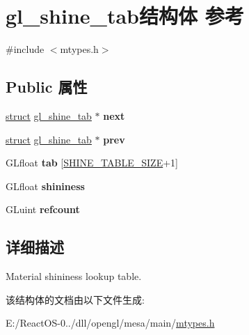 \hypertarget{structgl__shine__tab}{}\section{gl\+\_\+shine\+\_\+tab结构体 参考}
\label{structgl__shine__tab}


{\ttfamily \#include $<$mtypes.\+h$>$}

\subsection*{Public 属性}
\begin{DoxyCompactItemize}
\item 
\mbox{\label{structgl__shine__tab_abfcac7b422b65e0a62364338eef1131c}} 
\hyperlink{interfacestruct}{struct} \hyperlink{structgl__shine__tab}{gl\+\_\+shine\+\_\+tab} $\ast$ {\bfseries next}
\item 
\mbox{\label{structgl__shine__tab_a185d73519a887ba6f4fe4ed7eafd5063}} 
\hyperlink{interfacestruct}{struct} \hyperlink{structgl__shine__tab}{gl\+\_\+shine\+\_\+tab} $\ast$ {\bfseries prev}
\item 
\mbox{\label{structgl__shine__tab_a40618314a48453548012b4eaacd4ed96}} 
G\+Lfloat {\bfseries tab} \mbox{[}\hyperlink{mtypes_8h_a880440873857eb9f54f514721372ce02}{S\+H\+I\+N\+E\+\_\+\+T\+A\+B\+L\+E\+\_\+\+S\+I\+ZE}+1\mbox{]}
\item 
\mbox{\label{structgl__shine__tab_a430f8254a0c971eb758a1e51530e0bb8}} 
G\+Lfloat {\bfseries shininess}
\item 
\mbox{\label{structgl__shine__tab_a92e01cfa3ce45a2451212909a3509862}} 
G\+Luint {\bfseries refcount}
\end{DoxyCompactItemize}


\subsection{详细描述}
Material shininess lookup table. 

该结构体的文档由以下文件生成\+:\begin{DoxyCompactItemize}
\item 
E\+:/\+React\+O\+S-\/0../dll/opengl/mesa/main/\hyperlink{mtypes_8h}{mtypes.\+h}\end{DoxyCompactItemize}

